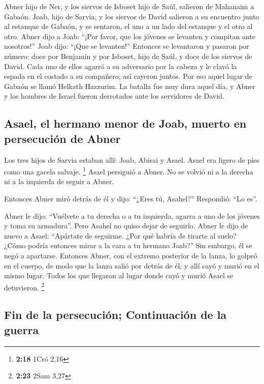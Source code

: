 \begin{paracol}{2}
 Abner hijo de Ner, y los siervos de Isboset hijo de
Saúl, salieron de Mahanaim a Gabaón.  Joab, hijo de
Sarvia, y los siervos de David salieron a su encuentro junto al estanque
de Gabaón, y se sentaron, el uno a un lado del estanque y el otro al
otro.  Abner dijo a Joab: ``¡Por favor, que los jóvenes
se levanten y compitan ante nosotros!'' Joab dijo: ``¡Que se levanten!''
 Entonces se levantaron y pasaron por número: doce por
Benjamín y por Isboset, hijo de Saúl, y doce de los siervos de David.
 Cada uno de ellos agarró a su adversario por la cabeza y
le clavó la espada en el costado a su compañero; así cayeron juntos. Por
eso aquel lugar de Gabaón se llamó Helkath Hazzurim.  La
batalla fue muy dura aquel día, y Abner y los hombres de Israel fueron
derrotados ante los servidores de David.

\hypertarget{asael-el-hermano-menor-de-joab-muerto-en-persecuciuxf3n-de-abner}{%
\subsection{Asael, el hermano menor de Joab, muerto en persecución de
Abner}\label{asael-el-hermano-menor-de-joab-muerto-en-persecuciuxf3n-de-abner}}

 Los tres hijos de Sarvia estaban allí: Joab, Abisai y
Asael. Asael era ligero de pies como una gacela salvaje. \footnote{\textbf{2:18}
  1Cró 2,16}  Asael persiguió a Abner. No se volvió ni a
la derecha ni a la izquierda de seguir a Abner.

 Entonces Abner miró detrás de él y dijo: ``¿Eres tú,
Asahel?'' Respondió: ``Lo es''.

 Abner le dijo: ``Vuélvete a tu derecha o a tu izquierda,
agarra a uno de los jóvenes y toma su armadura''. Pero Asahel no quiso
dejar de seguirlo.  Abner le dijo de nuevo a Asael:
``Apártate de seguirme. ¿Por qué habría de tirarte al suelo? ¿Cómo
podría entonces mirar a la cara a tu hermano Joab?''  Sin
embargo, él se negó a apartarse. Entonces Abner, con el extremo
posterior de la lanza, lo golpeó en el cuerpo, de modo que la lanza
salió por detrás de él; y allí cayó y murió en el mismo lugar. Todos los
que llegaron al lugar donde cayó y murió Asael se detuvieron.
\footnote{\textbf{2:23} 2Sam 3,27}

\hypertarget{fin-de-la-persecuciuxf3n-continuaciuxf3n-de-la-guerra}{%
\subsection{Fin de la persecución; Continuación de la
guerra}\label{fin-de-la-persecuciuxf3n-continuaciuxf3n-de-la-guerra}}


\end{paracol}
